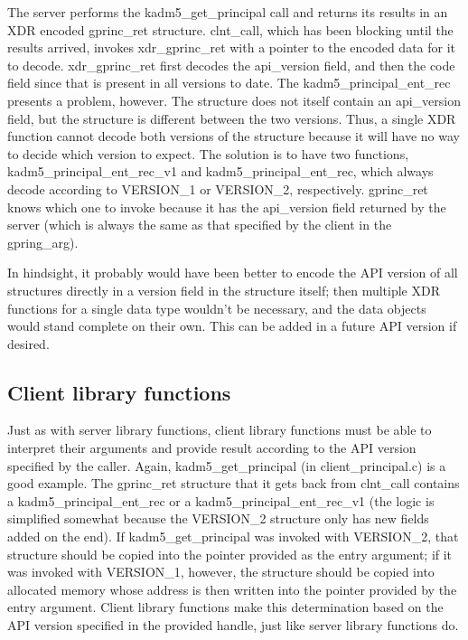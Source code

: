 The server performs the kadm5_get_principal call and returns its
results in an XDR encoded gprinc_ret structure.  clnt_call, which has
been blocking until the results arrived, invokes xdr_gprinc_ret with a
pointer to the encoded data for it to decode.  xdr_gprinc_ret first
decodes the api_version field, and then the code field since that is
present in all versions to date.  The kadm5_principal_ent_rec presents
a problem, however.  The structure does not itself contain an
api_version field, but the structure is different between the two
versions.  Thus, a single XDR function cannot decode both versions of
the structure because it will have no way to decide which version to
expect.  The solution is to have two functions,
kadm5_principal_ent_rec_v1 and kadm5_principal_ent_rec, which always
decode according to VERSION_1 or VERSION_2, respectively.  gprinc_ret
knows which one to invoke because it has the api_version field
returned by the server (which is always the same as that specified by
the client in the gpring_arg).

In hindsight, it probably would have been better to encode the API
version of all structures directly in a version field in the structure
itself; then multiple XDR functions for a single data type wouldn't be
necessary, and the data objects would stand complete on their own.
This can be added in a future API version if desired.

\subsection{Client library functions}

Just as with server library functions, client library functions must
be able to interpret their arguments and provide result according to
the API version specified by the caller.  Again, kadm5_get_principal
(in client_principal.c) is a good example.  The gprinc_ret structure
that it gets back from clnt_call contains a kadm5_principal_ent_rec or
a kadm5_principal_ent_rec_v1 (the logic is simplified somewhat because
the VERSION_2 structure only has new fields added on the end).  If
kadm5_get_principal was invoked with VERSION_2, that structure should
be copied into the pointer provided as the entry argument; if it was
invoked with VERSION_1, however, the structure should be copied into
allocated memory whose address is then written into the pointer
provided by the entry argument.  Client library functions make this
determination based on the API version specified in the provided
handle, just like server library functions do.

